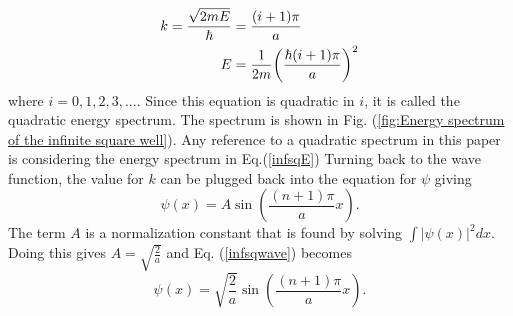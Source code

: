 \begin{align}
    k=\frac{\sqrt{2mE}}{\hbar}&=\frac{(i+1)\pi}{a}\\
    E&=\frac{1}{2m} \qty(\frac{\hbar (i+1)\pi}{a})^2 \label{infsqE}
\end{align}
where $i=0,1,2,3,...$. Since this equation is quadratic in $i$, it is called the quadratic energy spectrum. The spectrum is shown in Fig. (\ref{fig:Energy spectrum of the infinite square well}). Any reference to a quadratic spectrum in this paper is considering the energy spectrum in Eq.\@ (\ref{infsqE})
Turning back to the wave function, the value for $k$ can be plugged back into the equation for $\psi$ giving
\begin{equation}
    \psi(x)=A\sin(\frac{(n+1)\pi}{a}x). \label{infsqwave}
\end{equation}
The term $A$ is a normalization constant that is found by solving $\int|\psi(x)|^2 dx$. Doing this gives $A=\sqrt{\frac{2}{a}}$ and Eq. (\ref{infsqwave}) becomes 
\begin{equation}
    \psi(x)=\sqrt{\frac{2}{a}}\sin(\frac{(n+1)\pi}{a}x).
\end{equation}